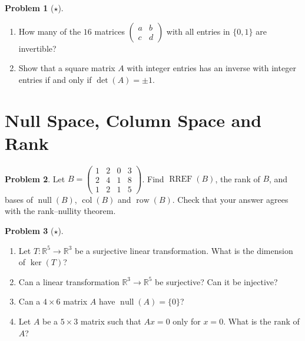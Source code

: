 \documentclass[11pt]{article}
\theoremstyle{definition}
\newtheorem{problem}{Problem}[section]
\DeclareMathOperator{\Null}{null}
\DeclareMathOperator{\col}{col}
\DeclareMathOperator{\row}{row}
\DeclareMathOperator{\RREF}{RREF}
\begin{document}
\begin{problem}[$\star$]\label{pr:01-matrices}
    \begin{enumerate}[label=(\alph*)]
        \item How many of the $16$ matrices $\begin{pmatrix} a & b \\ c & d \end{pmatrix}$ with all entries in $\{0, 1\}$ are invertible?
        \item Show that a square matrix $A$ with integer entries has an inverse with integer entries if and only if $\det(A) = \pm 1$.
    \end{enumerate}
\end{problem}

\section{Null Space, Column Space and Rank}

\begin{problem}\label{pr:bases-B}
    Let $B = \begin{pmatrix} 1 & 2 & 0 & 3 \\ 2 & 4 & 1 & 8 \\ 1 & 2 & 1 & 5 \end{pmatrix}$. Find $\RREF(B)$, the rank of $B$, and bases of $\Null(B)$, $\col(B)$ and $\row(B)$. Check that your answer agrees with the rank--nullity theorem.
\end{problem}

\begin{problem}[$\star$]\label{pr:onto}
    \begin{enumerate}[label=(\alph*)]
        \item Let $T: \mathbb{R}^5 \to \mathbb{R}^3$ be a surjective linear transformation. What is the dimension of $\ker(T)$?
        \item Can a linear transformation $\mathbb{R}^3 \to \mathbb{R}^5$ be surjective? Can it be injective?
        \item Can a $4 \times 6$ matrix $A$ have $\Null(A) = \{0\}$?
        \item Let $A$ be a $5 \times 3$ matrix such that $Ax = 0$ only for $x = 0$. What is the rank of $A$?
    \end{enumerate}
\end{problem}
\end{document}
